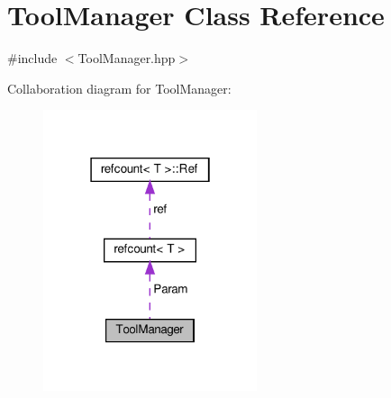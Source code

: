 \hypertarget{classToolManager}{}\section{Tool\+Manager Class Reference}
\label{classToolManager}


{\ttfamily \#include $<$Tool\+Manager.\+hpp$>$}



Collaboration diagram for Tool\+Manager\+:
\nopagebreak
\begin{figure}[H]
\begin{center}
\leavevmode
\includegraphics[width=178pt]{d1/d2d/classToolManager__coll__graph}
\end{center}
\end{figure}
